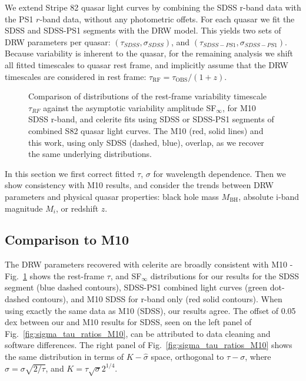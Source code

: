 \documentclass[twocolumn]{aastex62}
\newcommand{\project}[1]{\textsf{#1}}
\begin{document}
We extend Stripe 82 quasar light curves by combining the SDSS r-band data with  the PS1 $r$-band data, without any photometric offets. For each quasar we fit the SDSS and SDSS-PS1 segments  with the DRW model. This yields two sets of DRW parameters per quasar: $(\tau_{SDSS}, \sigma_{SDSS})$, and $(\tau_{SDSS-PS1},\sigma_{SDSS-PS1})$. Because variability is inherent to the quasar, for the remaining analysis we shift all fitted timescales to quasar rest frame, and implicitly assume that the DRW timescales are considered in rest frame: $\tau_{\mathrm{RF}} = \tau_{\mathrm{OBS}} / (1+z)$.

\begin{figure} %
	\caption{Comparison of distributions of the rest-frame variability timescale $\tau_{RF}$ against the  asymptotic variability amplitude SF$_{\infty}$, for M10 SDSS r-band,  and \project{celerite} fits using  SDSS or SDSS-PS1 segments of combined S82 quasar light curves. The M10 (red, solid lines) and this work, using only SDSS (dashed, blue), overlap, as we recover the same underlying distributions. }
	\label{fig:tau_sf_dist}
\end{figure} 


In this section we first correct fitted $\tau$, $\sigma$ for wavelength dependence. Then we show consistency with M10 results,  and consider the trends between DRW parameters and physical quasar properties: black hole mass $M_{\mathrm{BH}}$, absolute i-band  magnitude $M_{i}$, or redshift $z$.  


\subsection{Comparison to M10}
The DRW parameters recovered with \project{celerite} are  broadly consistent with M10 - Fig.~\ref{fig:tau_sf_dist} shows the rest-frame  $\tau$, and SF$_{\infty}$ distributions for our results for the SDSS segment (blue dashed contours),  SDSS-PS1 combined light curves (green dot-dashed contours), and  M10 SDSS for r-band only (red solid contours). When using exactly the same data as M10 (SDSS), our results agree. The offset of 0.05 dex  between our and M10 results for SDSS, seen on the left panel of Fig.~\ref{fig:sigma_tau_ratios_M10}, can be attributed to data cleaning and software differences. The right panel of Fig.~\ref{fig:sigma_tau_ratios_M10} shows the same distribution in terms of $K-\hat{\sigma}$ space, orthogonal to $\tau-\sigma$, where $\hat{\sigma} = \sigma\sqrt{2 / \tau}$, and $K = \tau \sqrt{\sigma} 2^{1/4} $. 
\end{document}
